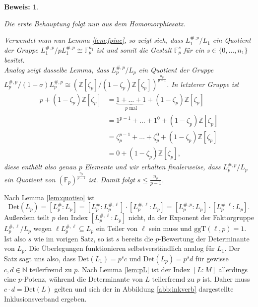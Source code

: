 \documentclass[12pt,a4paper,halfparskip,headsepline,bibtotocnumbered]{scrreprt}
\theoremstyle{nummermitklammern}
\theoremstyle{nonumberbreak}
\newtheorem{beweis}{Beweis:}
\newcommand{\N}{\mathbb{N}}
\newcommand{\Z}{\mathbb{Z}}
\newcommand{\F}{\mathbb{F}}
\newcommand{\Det}{\text{Det}}
\begin{document}
\begin{beweis}
\begin{itemize}[align=left, leftmargin = *]
	\end{itemize}
	Die erste Behauptung folgt nun aus dem Homomorphiesatz.\par
	Verwendet man nun Lemma \eqref{lem:fpinc}, so zeigt sich, dass $L_1^{\#, p} / L_1$ ein Quotient der Gruppe $L_1^{\#, p} / p L_1^{\#,p} \cong \F_p^{n_1}$ ist und somit die Gestalt $\F_p^s$ für ein $s \in \lbrace 0, \dots, n_1 \rbrace$ besitzt.\\
	Analog zeigt dasselbe Lemma, dass $L_p^{\#,p} / L_p$ ein Quotient der Gruppe $L_p^{\#,p} / (1 - \sigma) L_p^{\#,p} \cong (\Z\left[ \zeta_p \right] / (1 - \zeta_p) \Z\left[ \zeta_p \right])^\frac{n_p}{p-1}$. In letzterer Gruppe ist
	\begin{align*}
		p + (1 - \zeta_p) \Z\left[ \zeta_p \right] &= \underbrace{1 + \dots + 1}_{p \text{ mal}} + (1 - \zeta_p) \Z\left[ \zeta_p \right]\\
		&= 1^{p-1} + \dots + 1^0 + (1 - \zeta_p) \Z\left[ \zeta_p \right]\\
		 &= \zeta_p^{p-1} + \dots + \zeta_p^0 + (1 - \zeta_p) \Z\left[ \zeta_p \right]\\
		 &= 0 + (1 - \zeta_p) \Z\left[ \zeta_p \right],
	\end{align*}
	diese enthält also genau $p$ Elemente und wir erhalten finalerweise, dass $L_p^{\#, p} / L_p$ ein Quotient von $(\F_p)^\frac{n_p}{p-1}$ ist. Damit folgt $s \leq \frac{n_p}{p-1}$.
\end{beweis}

Nach Lemma \eqref{lem:quotiso} ist
\begin{equation*}
	\Det(L_p) = \left[ L_p^\# : L_p \right] = \left[ L_p^\# : L_p^{\#,\ell} \right] \cdot \left[ L_p^{\#, \ell} : L_p \right] = \left[ L_p^{\#,p} : L_p \right] \cdot \left[ L_p^{\#, \ell} : L_p \right].
\end{equation*}
Außerdem teilt $p$ den Index $\left[ L_p^{\#, \ell} : L_p \right]$ nicht, da der Exponent der Faktorgruppe $L_p^{\#, \ell} / L_p$ wegen $\ell L_p^{\#, \ell} \subseteq L_p$ ein Teiler von $\ell$ sein muss und $\text{ggT}(\ell,p) = 1$. Ist also $s$ wie im vorigen Satz, so ist $s$ bereits die $p$-Bewertung der Determinante von $L_p$. Die Überlegungen funktionieren selbstverständlich analog für $L_1$. Der Satz sagt uns also, dass $\Det(L_1) = p^s c$ und $\Det(L_p) = p^s d$ für gewisse $c, d \in \N$ teilerfremd zu $p$. Nach Lemma \eqref{lem:pL} ist der Index $\left[ L : M \right]$ allerdings eine $p$-Potenz, während die Determinante von $L$ teilerfremd zu $p$ ist. Daher muss $c \cdot d = \Det(L)$ gelten und sich der in Abbildung \eqref{abb:inkverb} dargestellte Inklusionsverband ergeben.
\end{document}

